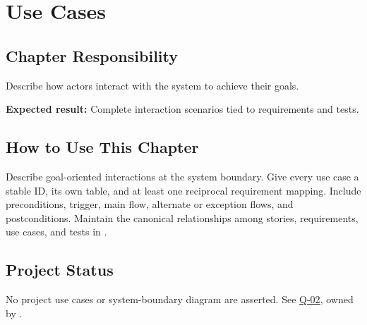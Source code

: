 \chapter{Use Cases}
\section{Chapter Responsibility}
\label{Section:UseCasesResponsibility}
Describe how actors interact with the system to achieve their goals.

\noindent\textbf{Expected result:} Complete interaction scenarios tied to requirements and tests.

\section{How to Use This Chapter}
Describe goal-oriented interactions at the system boundary. Give every use case
a stable ID, its own table, and at least one reciprocal requirement mapping.
Include preconditions, trigger, main flow, alternate or exception flows, and
postconditions. Maintain the canonical relationships among stories,
requirements, use cases, and tests in .


\section{Project Status}
No project use cases or system-boundary diagram are asserted.
See \hyperref[Question:Q-02]{Q-02}, owned by \DocumentOwner.

